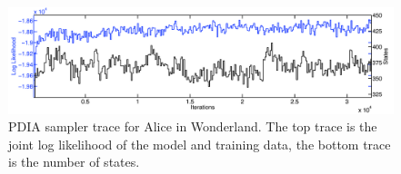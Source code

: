 \begin{figure}[htbp]
\centering
\includegraphics[width=1\textwidth]{results/aiw_sampler_trace}
\caption{PDIA sampler trace for Alice in Wonderland.  The top trace is the joint log likelihood of the model and training data, the bottom trace is the number of states.\label{fig:aiw_sampler_trace}}
\end{figure}













